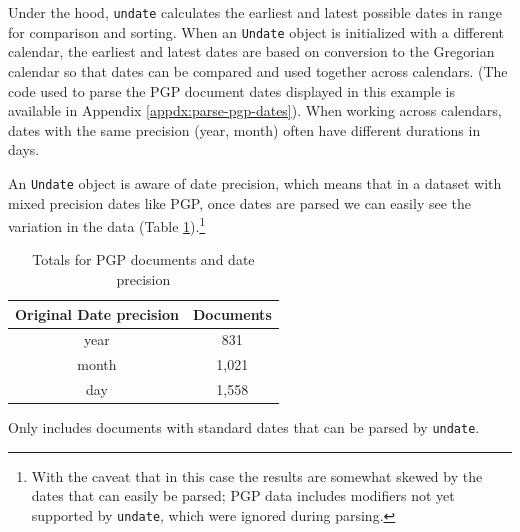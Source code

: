 \documentclass[final]{anthology-ch} %
\begin{document}
Under the hood, \texttt{undate} calculates the earliest and latest possible dates in range for comparison and sorting. When an \texttt{Undate} object is initialized with a different calendar, the earliest and latest dates are based on conversion to the Gregorian calendar so that dates can be compared and used together across calendars. (The code used to parse the PGP document dates displayed in this example is available in Appendix \ref{appdx:parse-pgp-dates}). When working across calendars, dates with the same precision (year, month) often have different durations in days.

An \texttt{Undate} object is aware of date precision, which means that in a dataset with mixed precision dates like PGP, once dates are parsed we can easily see the variation in the data (Table \ref{tab:pgp-date-precisions}).\footnote{With the caveat that in this case the results are somewhat skewed by the dates that can easily be parsed; PGP data includes modifiers not yet supported by \texttt{undate}, which were ignored during parsing.}

\begin{table}[h]
  \centering 
  \begin{tabular}{cc}
    \toprule
    Original Date precision & Documents \\ 
    \midrule
    year & 831 \\
    month & 1,021 \\
    day & 1,558 \\
    \bottomrule
  \end{tabular}
  \caption{Totals for PGP documents and date precision}
    \medskip
    \small
    Only includes documents with standard dates that can be parsed by \texttt{undate}.
  \label{tab:pgp-date-precisions}
\end{table}
\end{document}
